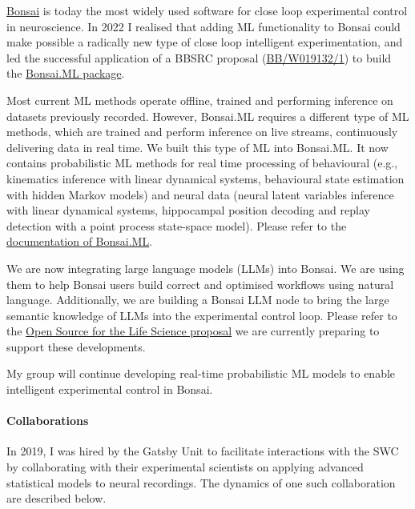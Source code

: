 \documentclass{article}
\begin{document}
\href{https://bonsai-rx.org/}{Bonsai} is today the most widely used software
for close loop experimental control in neuroscience. In 2022 I realised that
adding ML functionality to Bonsai could make possible a radically new type of
close loop intelligent experimentation, and led the successful application of
a BBSRC proposal
(\href{https://gtr.ukri.org/projects?ref=BB\%2FW019132\%2F1}{BB/W019132/1}) to
build the \href{https://bonsai-rx.org/machinelearning/}{Bonsai.ML package}.

Most current ML methods operate offline, trained and performing inference on
datasets previously recorded. However, Bonsai.ML requires a different type of ML
methods, which are trained and perform inference on live streams, continuously
delivering data in real time. We built this type of ML into Bonsai.ML. It now
contains probabilistic ML methods for real time processing of behavioural (e.g.,
kinematics inference with linear dynamical systems, behavioural state estimation
with hidden Markov models) and neural data (neural latent variables inference
with linear dynamical systems, hippocampal position decoding and replay detection with a
point process state-space model). Please refer to the
\href{https://bonsai-rx.org/machinelearning/}{documentation of
Bonsai.ML}.

We are now integrating large language models (LLMs) into Bonsai. We are using
them to help Bonsai users build correct and optimised workflows using natural
language. Additionally, we are building a Bonsai LLM node to bring the large
semantic knowledge of LLMs into the experimental control loop.  Please refer to
the
\href{https://github.com/joacorapela/os4ls/blob/master/application/application.md}{Open
Source for the Life Science proposal} we are currently preparing to support
these developments.

My group will continue developing real-time probabilistic ML models to enable
intelligent experimental control in Bonsai.

\paragraph{Collaborations} 

In 2019, I was hired by the Gatsby Unit to facilitate interactions with the SWC
by collaborating with their experimental scientists on applying advanced
statistical models to neural recordings. The dynamics of one such collaboration
are described below.
\end{document}
